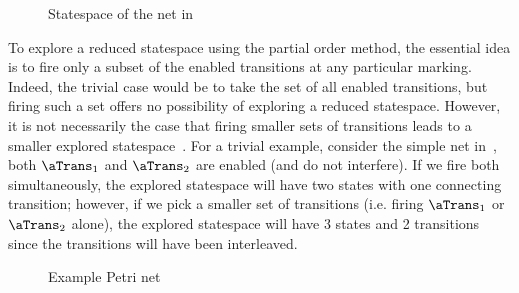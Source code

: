 \begin{figure}[ht]
\centering
{}
\caption{Statespace of the net in }
\label{fig:lowInterferenceNetLTS}
\end{figure}

To explore a reduced statespace using the partial order method, the essential
idea is to fire only a subset of the enabled transitions at any particular
marking. Indeed, the trivial case would be to take the set of all
enabled transitions, but firing such a set offers no possibility of exploring a
reduced statespace. However, it is not necessarily the case that firing smaller
sets of transitions leads to a smaller explored statespace~\cite{Valmari1998}.
For a trivial example, consider the simple net
in~, both $\aTrans_1$ and $\aTrans_2$ are
enabled (and do not interfere). If we fire both simultaneously, the explored
statespace will have two states with one connecting transition; however, if we
pick a smaller set of transitions (i.e.  firing $\aTrans_1$ or $\aTrans_2$
alone), the explored statespace will have 3 states and 2 transitions since the
transitions will have been interleaved.

\begin{figure}[ht]
\centering
{}
\caption{Example Petri net}
\label{fig:concurrentEnabledNet}
\end{figure}

